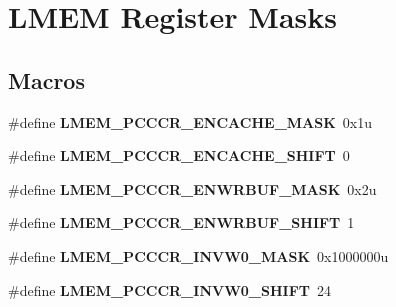 \hypertarget{group___l_m_e_m___register___masks}{}\section{L\+M\+E\+M Register Masks}
\label{group___l_m_e_m___register___masks}
\subsection*{Macros}
\begin{DoxyCompactItemize}
\item 
\hypertarget{group___l_m_e_m___register___masks_ga47e05c9467999292addb0bb22bf010eb}{}\#define {\bfseries L\+M\+E\+M\+\_\+\+P\+C\+C\+C\+R\+\_\+\+E\+N\+C\+A\+C\+H\+E\+\_\+\+M\+A\+S\+K}~0x1u\label{group___l_m_e_m___register___masks_ga47e05c9467999292addb0bb22bf010eb}

\item 
\hypertarget{group___l_m_e_m___register___masks_ga82db54483659442eb030dc064dbd6fa6}{}\#define {\bfseries L\+M\+E\+M\+\_\+\+P\+C\+C\+C\+R\+\_\+\+E\+N\+C\+A\+C\+H\+E\+\_\+\+S\+H\+I\+F\+T}~0\label{group___l_m_e_m___register___masks_ga82db54483659442eb030dc064dbd6fa6}

\item 
\hypertarget{group___l_m_e_m___register___masks_ga934fdc43b0598c017a05a7335de0136b}{}\#define {\bfseries L\+M\+E\+M\+\_\+\+P\+C\+C\+C\+R\+\_\+\+E\+N\+W\+R\+B\+U\+F\+\_\+\+M\+A\+S\+K}~0x2u\label{group___l_m_e_m___register___masks_ga934fdc43b0598c017a05a7335de0136b}

\item 
\hypertarget{group___l_m_e_m___register___masks_gaaf2945e7a6a6497bc83136a2d551d844}{}\#define {\bfseries L\+M\+E\+M\+\_\+\+P\+C\+C\+C\+R\+\_\+\+E\+N\+W\+R\+B\+U\+F\+\_\+\+S\+H\+I\+F\+T}~1\label{group___l_m_e_m___register___masks_gaaf2945e7a6a6497bc83136a2d551d844}

\item 
\hypertarget{group___l_m_e_m___register___masks_ga0be513272f5e22997c2edf3c3523af34}{}\#define {\bfseries L\+M\+E\+M\+\_\+\+P\+C\+C\+C\+R\+\_\+\+I\+N\+V\+W0\+\_\+\+M\+A\+S\+K}~0x1000000u\label{group___l_m_e_m___register___masks_ga0be513272f5e22997c2edf3c3523af34}

\item 
\hypertarget{group___l_m_e_m___register___masks_ga18cb36b72f592f87eae5232c92b88851}{}\#define {\bfseries L\+M\+E\+M\+\_\+\+P\+C\+C\+C\+R\+\_\+\+I\+N\+V\+W0\+\_\+\+S\+H\+I\+F\+T}~24\label{group___l_m_e_m___register___masks_ga18cb36b72f592f87eae5232c92b88851}


\end{DoxyCompactItemize}
